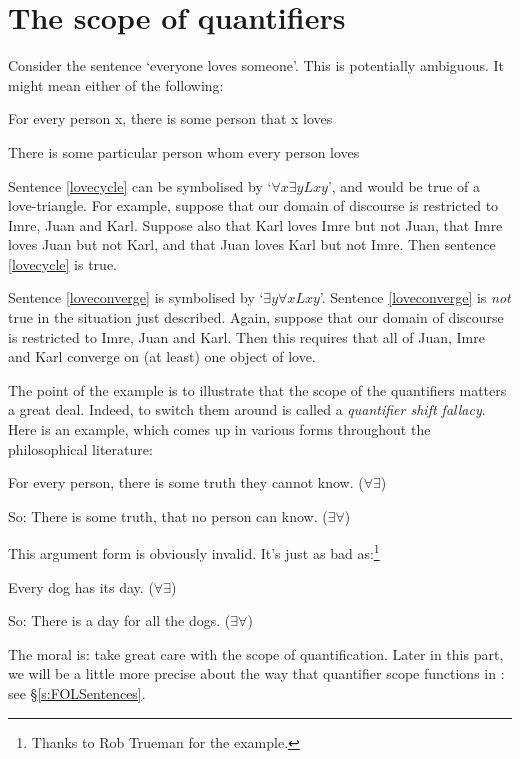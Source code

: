 \section{The scope of quantifiers}
Consider the sentence `everyone loves someone'. This is potentially ambiguous. It might mean either of the following:
	\begin{earg}
		\item[\ex{lovecycle}] For every person x, there is some person that x loves
		\item[\ex{loveconverge}] There is some particular person whom every person loves
	\end{earg}
Sentence \ref{lovecycle} can be symbolised by `$\forall x \exists y Lxy$', and would be true of a love-triangle. For example, suppose that our domain of discourse is restricted to Imre, Juan and Karl. Suppose also that Karl loves Imre but not Juan, that Imre loves Juan but not Karl, and that Juan loves Karl but not Imre. Then sentence \ref{lovecycle} is true. 

Sentence \ref{loveconverge} is symbolised by `$\exists y \forall x Lxy$'. Sentence \ref{loveconverge} is \emph{not} true in the situation just described. Again, suppose that our domain of discourse is restricted to Imre, Juan and Karl. Then this requires that all of Juan, Imre and Karl converge on (at least) one object of love. 

The point of the example is to illustrate that the scope of the quantifiers matters a great deal. Indeed, to switch them around is called a \emph{quantifier shift fallacy}. Here is an example, which comes up in various forms throughout the philosophical literature:
	\begin{earg}
		\item[] For every person, there is some truth they cannot know. \hfill ($\forall \exists$)
		\item[So:] There is some truth, that no person can know. \hfill ($\exists \forall$)
	\end{earg}
This argument form is obviously invalid. It's just as bad as:\footnote{Thanks to Rob Trueman for the example.}
	\begin{earg}
		\item[] Every dog has its day. \hfill ($\forall \exists$)
		\item[So:] There is a day for all the dogs. \hfill ($\exists \forall$)
	\end{earg}
The moral is: take great care with the scope of quantification. Later in this part, we will be a little more precise about the way that quantifier scope functions in \FOL: see §\ref{s:FOLSentences}. 

